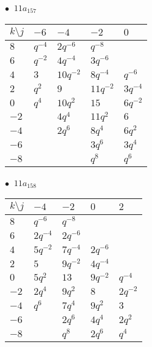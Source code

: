 \begin{minipage}{\linewidth}
$\bullet\ $ $11a_{157}$ \vspace{0.5em} \\
\begin{tabular}{l|llll}
$k \setminus j$ & $-6$ & $-4$ & $-2$ & $0$ \\
\hline
$8$ & $q^{-4}$ & $2q^{-6}$ & $q^{-8}$ &  \\
$6$ & $q^{-2}$ & $4q^{-4}$ & $3q^{-6}$ &  \\
$4$ & $3$ & $10q^{-2}$ & $8q^{-4}$ & $q^{-6}$ \\
$2$ & $q^{2}$ & $9$ & $11q^{-2}$ & $3q^{-4}$ \\
$0$ & $q^{4}$ & $10q^{2}$ & $15$ & $6q^{-2}$ \\
$-2$ &  & $4q^{4}$ & $11q^{2}$ & $6$ \\
$-4$ &  & $2q^{6}$ & $8q^{4}$ & $6q^{2}$ \\
$-6$ &  &  & $3q^{6}$ & $3q^{4}$ \\
$-8$ &  &  & $q^{8}$ & $q^{6}$ \\
\end{tabular}
\vspace{2em}
\end{minipage}
%
\begin{minipage}{\linewidth}
$\bullet\ $ $11a_{158}$ \vspace{0.5em} \\
\begin{tabular}{l|llll}
$k \setminus j$ & $-4$ & $-2$ & $0$ & $2$ \\
\hline
$8$ & $q^{-6}$ & $q^{-8}$ &  &  \\
$6$ & $2q^{-4}$ & $2q^{-6}$ &  &  \\
$4$ & $5q^{-2}$ & $7q^{-4}$ & $2q^{-6}$ &  \\
$2$ & $5$ & $9q^{-2}$ & $4q^{-4}$ &  \\
$0$ & $5q^{2}$ & $13$ & $9q^{-2}$ & $q^{-4}$ \\
$-2$ & $2q^{4}$ & $9q^{2}$ & $8$ & $2q^{-2}$ \\
$-4$ & $q^{6}$ & $7q^{4}$ & $9q^{2}$ & $3$ \\
$-6$ &  & $2q^{6}$ & $4q^{4}$ & $2q^{2}$ \\
$-8$ &  & $q^{8}$ & $2q^{6}$ & $q^{4}$ \\
\end{tabular}
\vspace{2em}
\end{minipage}
%
